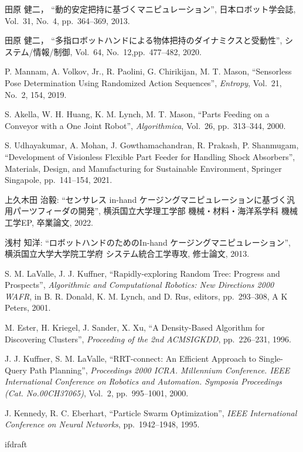 \documentclass[a4paper,twoside,12pt,papersize, dvipdfmx]{iirthesis}
\begin{document}
\begin{thebibliography}{99}
田原 健二，
``動的安定把持に基づくマニピュレーション'',
日本ロボット学会誌,
Vol.~31, No.~4, pp.~364--369,
2013.  	

田原 健二，
``多指ロボットハンドによる物体把持のダイナミクスと受動性'',
システム/情報/制御,
Vol.~64, No.~12,pp.~477--482,
2020. 
 	
P. Mannam, A. Volkov, Jr., R. Paolini, G. Chirikijan, M. T. Mason,
``Sensorless Pose Determination Using Randomized Action Sequences'',
 {\it Entropy}, Vol.~21, No.~2, 154, 
2019.

S. Akella, W. H. Huang, K. M. Lynch, M. T. Mason,
``Parts Feeding on a Conveyor with a One Joint Robot'',
 {\it Algorithmica},
 Vol.~26,
 pp.~313--344,
2000.
 	
S. Udhayakumar, A. Mohan, J. Gowthamachandran,  R. Prakash, P. Shanmugam,
``Development of Visionless Flexible Part Feeder for Handling Shock Absorbers'',
 Materials, Design, and Manufacturing for Sustainable Environment, Springer Singapole, 
 pp.~141--154,
2021.  	
  	
上久木田 治毅:
``センサレス in-hand ケージングマニピュレーションに基づく汎用パーツフィーダの開発'', 
横浜国立大学理工学部 機械・材料・海洋系学科 機械工学EP, 卒業論文, 2022.
  	
浅村 知洋:
``ロボットハンドのためのIn-hand ケージングマニピュレーション'', 
横浜国立大学大学院工学府 システム統合工学専攻, 修士論文, 2013.

S. M. LaValle, J. J. Kuffner, 
``Rapidly-exploring Random Tree: Progress and Prospects'', 
{\it Algorithmic and Computational Robotics: New Directions 2000 WAFR}, 
in B. R. Donald, K. M. Lynch, and D. Rus, editors, 
pp.~293--308, A K Peters, 2001.

M. Ester, H. Kriegel, J. Sander, X. Xu, 
``A Density-Based Algorithm for Discovering Clusters'', 
{\it Proceeding of the 2nd ACMSIGKDD}, 
pp.~226--231, 1996.
  	
J. J. Kuffner, S. M. LaValle, 
``RRT-connect: An Efficient Approach to Single-Query Path Planning'',
{\it Proceedings 2000 ICRA. Millennium Conference. IEEE International Conference on Robotics and Automation. Symposia Proceedings (Cat. No.00CH37065)}, 
Vol.~2, pp.~995--1001, 2000.
  	
J. Kennedy, R. C. Eberhart,
``Particle Swarm Optimization'',
{\it IEEE International Conference on Neural Networks},
pp.~1942--1948, 1995.
\end{thebibliography}

\expandafter\ifx\csname ifdraft\endcsname\relax
    
\end{document}
